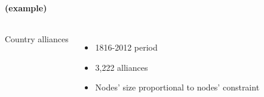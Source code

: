 \documentclass[8pt]{beamer}
\begin{document}
\begin{frame}[fragile]
\frametitle{\insertsection}
\framesubtitle{\insertsubsection \vspace{0.1cm} (example)}

\begin{columns}[c]

\begin{minipage}[c][.5\textheight][c]{\linewidth}


Country alliances
\begin{itemize}
\item 1816-2012 period     
\item 3,222 alliances
\item Nodes' size proportional to nodes' constraint
\end{itemize}

\medskip
\medskip

\end{minipage}	   


\begin{minipage}[c][.5\textheight][c]{\linewidth}
\centering



\end{minipage}
\end{columns}
\end{frame}
\end{document}
